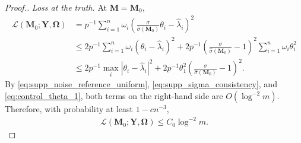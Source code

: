 \documentclass[numsec,webpdf,modern,large,namedate]{oup-authoring-template}
\theoremstyle{plain}
\theoremstyle{remark}
\newcommand{\M}{\bm{M}}
\newcommand{\Y}{\bm{Y}}
\newcommand{\bOmega}{\bm{\Omega}}
\newif\ifmarkchanges
\newenvironment{revision}{\begingroup\ifmarkchanges\color{red}\fi}{\endgroup}
\begin{document}
\begin{revision}
\begin{proof}[Proof.]
\textit{Loss at the truth.} At $\M=\M_0$,
\begin{align*}
    \mathcal L(\M_0;\Y,\bOmega)
    &=p^{-1}\sum_{i=1}^n\omega_i
      \left(
      \frac{\sigma}{\widehat\sigma(\M_0)}\theta_i
      -\widehat\lambda_i
      \right)^2\\
    &\le2p^{-1}\sum_{i=1}^n\omega_i
      (\theta_i-\widehat\lambda_i)^2
      +2p^{-1}\left(
      \frac{\sigma}{\widehat\sigma(\M_0)}-1
      \right)^2
      \sum_{i=1}^n\omega_i\theta_i^2\\
    &\le2p^{-1}\max_i
      |\theta_i-\widehat\lambda_i|^2
      +2p^{-1}\theta_1^2
      \left(
      \frac{\sigma}{\widehat\sigma(\M_0)}-1
      \right)^2.
\end{align*}
By \eqref{eq:supp_noise_reference_uniform}, \eqref{eq:supp_sigma_consistency},
and \eqref{eq:control_theta_1}, both terms on the right-hand side are
$O(\log^{-2}m)$.  Therefore, with probability at least $1-cn^{-3}$,
\begin{align*}
    \mathcal L(\M_0;\Y,\bOmega)
    \le C_0\log^{-2}m.
\end{align*}
\end{proof}
\end{revision}
\end{document}
